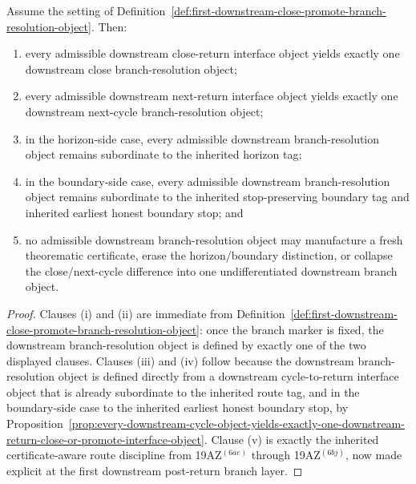 \begin{proposition}
\label{prop:every-downstream-return-interface-object-admits-exactly-one-honest-downstream-close-or-promote-branch-choice}
Assume the setting of Definition~\ref{def:first-downstream-close-promote-branch-resolution-object}. Then:
\begin{enumerate}[label=(\roman*)]
  \item every admissible downstream close-return interface object yields exactly one downstream close branch-resolution object;
  \item every admissible downstream next-return interface object yields exactly one downstream next-cycle branch-resolution object;
  \item in the horizon-side case, every admissible downstream branch-resolution object remains subordinate to the inherited horizon tag;
  \item in the boundary-side case, every admissible downstream branch-resolution object remains subordinate to the inherited stop-preserving boundary tag and inherited earliest honest boundary stop; and
  \item no admissible downstream branch-resolution object may manufacture a fresh theorematic certificate, erase the horizon/boundary distinction, or collapse the close/next-cycle difference into one undifferentiated downstream branch object.
\end{enumerate}
\end{proposition}

\begin{proof}
Clauses (i) and (ii) are immediate from Definition~\ref{def:first-downstream-close-promote-branch-resolution-object}: once the branch marker is fixed, the downstream branch-resolution object is defined by exactly one of the two displayed clauses. Clauses (iii) and (iv) follow because the downstream branch-resolution object is defined directly from a downstream cycle-to-return interface object that is already subordinate to the inherited route tag, and in the boundary-side case to the inherited earliest honest boundary stop, by Proposition~\ref{prop:every-downstream-cycle-object-yields-exactly-one-downstream-return-close-or-promote-interface-object}. Clause (v) is exactly the inherited certificate-aware route discipline from 19AZ$^{(6ae)}$ through 19AZ$^{(6bj)}$, now made explicit at the first downstream post-return branch layer.
\end{proof}

